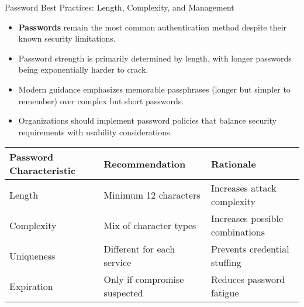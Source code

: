 \documentclass{beamer}
\begin{document}
\begin{frame}{Password Best Practices: Length, Complexity, and Management}
    \begin{itemize}
        \item \textbf{Passwords} remain the most common authentication method despite their known security limitations.
        \item Password strength is primarily determined by length, with longer passwords being exponentially harder to crack.
        \item Modern guidance emphasizes memorable passphrases (longer but simpler to remember) over complex but short passwords.
        \item Organizations should implement password policies that balance security requirements with usability considerations.
    \end{itemize}
    
    \begin{table}
        \scriptsize
        \begin{tabular}{|l|l|l|}
            \hline
            \textbf{Password Characteristic} & \textbf{Recommendation} & \textbf{Rationale} \\
            \hline
            Length & Minimum 12 characters & Increases attack complexity \\
            Complexity & Mix of character types & Increases possible combinations \\
            Uniqueness & Different for each service & Prevents credential stuffing \\
            Expiration & Only if compromise suspected & Reduces password fatigue \\
            \hline
        \end{tabular}
    \end{table}
\end{frame}
\end{document}
